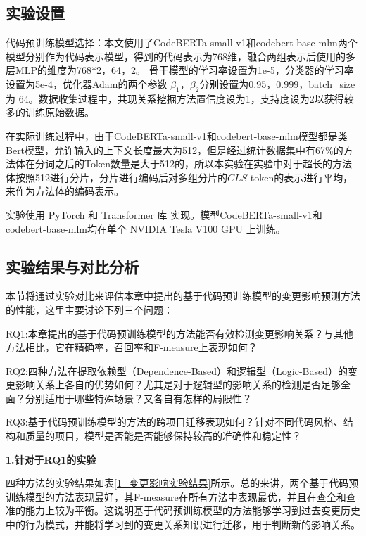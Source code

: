 \subsection{实验设置}

代码预训练模型选择：本文使用了CodeBERTa-small-v1和codebert-base-mlm两个模型分别作为代码表示模型，得到的代码表示为768维，融合两组表示后使用的多层MLP的维度为768*2，64，2。 骨干模型的学习率设置为1e-5，分类器的学习率设置为5e-4，优化器Adam的两个参数 $\beta_1$，$\beta_2$分别设置为0.95，0.999，batch\_size 为 64。数据收集过程中，共现关系挖掘方法置信度设为1，支持度设为2以获得较多的训练原始数据。

在实际训练过程中，由于CodeBERTa-small-v1和codebert-base-mlm模型都是类Bert模型，允许输入的上下文长度最大为512，但是经过统计数据集中有67\%的方法体在分词之后的Token数量是大于512的，所以本实验在实验中对于超长的方法体按照512进行分片，分片进行编码后对多组分片的$CLS$ token的表示进行平均，来作为方法体的编码表示。

实验使用 PyTorch 和 Transformer 库 实现。模型CodeBERTa-small-v1和codebert-base-mlm均在单个 NVIDIA Tesla V100 GPU 上训练。


\subsection{实验结果与对比分析}

本节将通过实验对比来评估本章中提出的基于代码预训练模型的变更影响预测方法的性能，这里主要讨论下列三个问题：

RQ1:本章提出的基于代码预训练模型的方法能否有效检测变更影响关系？与其他方法相比，它在精确率，召回率和F-measure上表现如何？

RQ2:四种方法在提取依赖型（Dependence-Based）和逻辑型（Logic-Based）的变更影响关系上各自的优势如何？尤其是对于逻辑型的影响关系的检测是否足够全面？分别适用于哪些特殊场景？又各自有怎样的局限性？

RQ3:基于代码预训练模型的方法的跨项目迁移表现如何？针对不同代码风格、结构和质量的项目，模型是否能是否能够保持较高的准确性和稳定性？

\textbf{1.针对于RQ1的实验}

四种方法的实验结果如表\ref{1_变更影响实验结果}所示。总的来讲，两个基于代码预训练模型的方法表现最好，其F-measure在所有方法中表现最优，并且在查全和查准的能力上较为平衡。这说明基于代码预训练模型的方法能够学习到过去变更历史中的行为模式，并能将学习到的变更关系知识进行迁移，用于判断新的影响关系。

